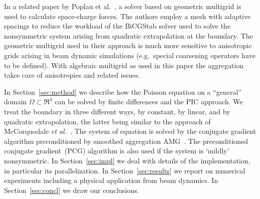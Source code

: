 In a related paper by Poplau et al.~\cite{poplau_self-adaptive_2008}, a
solver based on geometric multigrid is used to calculate space-charge
forces.  The authors employ a mesh with adaptive spacings to reduce the
workload of the BiCGStab solver used to solve the nonsymmetric system
arising from quadratic extrapolation at the boundary.  The geometric
multigrid used in their approach is much more sensitive to anisotropic
grids arising in beam dynamic simulations (e.g.\ special coarsening
operators have to be defined).  With algebraic multigrid as used in this
paper the aggregation takes care of anisotropies and related issues.

In Section~\ref{sec:method} we describe how the Poisson equation on a
``general'' domain $\Omega \subset \Re^3$ can be solved by finite
differences and the PIC approach.  We treat the boundary in three
different ways, by constant, by linear, and by quadratic extrapolation,
the latter being similar to the approach of McCorquodale \textit{et
  al.}~\cite{mcgv:04}.  The system of equation is solved by the
conjugate gradient algorithm preconditioned by smoothed aggregation
AMG~\cite{vamb:96a, tuto:00}.  The preconditioned conjugate
gradient~(PCG) algorithm is also used if the system is `mildly'
nonsymmetric.  In Section~\ref{sec:impl} we deal with details of the
implementation, in particular its parallelization.  In
Section~\ref{sec:results} we report on numerical experiments including a
physical application from beam dynamics.  In Section~\ref{sec:concl} we
draw our conclusions.




